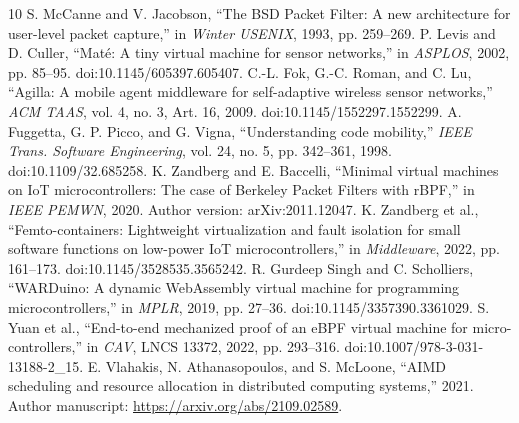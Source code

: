 \documentclass[conference,letterpaper]{IEEEtran}
\begin{document}
\begin{thebibliography}{10}
 S. McCanne and V. Jacobson, ``The BSD Packet Filter: A new architecture for user-level packet capture,'' in \emph{Winter USENIX}, 1993, pp. 259--269.
 P. Levis and D. Culler, ``Mat\'e: A tiny virtual machine for sensor networks,'' in \emph{ASPLOS}, 2002, pp. 85--95. doi:10.1145/605397.605407.
 C.-L. Fok, G.-C. Roman, and C. Lu, ``Agilla: A mobile agent middleware for self-adaptive wireless sensor networks,'' \emph{ACM TAAS}, vol. 4, no. 3, Art. 16, 2009. doi:10.1145/1552297.1552299.
 A. Fuggetta, G. P. Picco, and G. Vigna, ``Understanding code mobility,'' \emph{IEEE Trans. Software Engineering}, vol. 24, no. 5, pp. 342--361, 1998. doi:10.1109/32.685258.
 K. Zandberg and E. Baccelli, ``Minimal virtual machines on IoT microcontrollers: The case of Berkeley Packet Filters with rBPF,'' in \emph{IEEE PEMWN}, 2020. Author version: arXiv:2011.12047.
 K. Zandberg et al., ``Femto-containers: Lightweight virtualization and fault isolation for small software functions on low-power IoT microcontrollers,'' in \emph{Middleware}, 2022, pp. 161--173. doi:10.1145/3528535.3565242.
 R. Gurdeep Singh and C. Scholliers, ``WARDuino: A dynamic WebAssembly virtual machine for programming microcontrollers,'' in \emph{MPLR}, 2019, pp. 27--36. doi:10.1145/3357390.3361029.
 S. Yuan et al., ``End-to-end mechanized proof of an eBPF virtual machine for micro-controllers,'' in \emph{CAV}, LNCS 13372, 2022, pp. 293--316. doi:10.1007/978-3-031-13188-2\_15.
 E. Vlahakis, N. Athanasopoulos, and S. McLoone, ``AIMD scheduling and resource allocation in distributed computing systems,'' 2021. Author manuscript: \url{https://arxiv.org/abs/2109.02589}.
\end{thebibliography}
\end{document}
